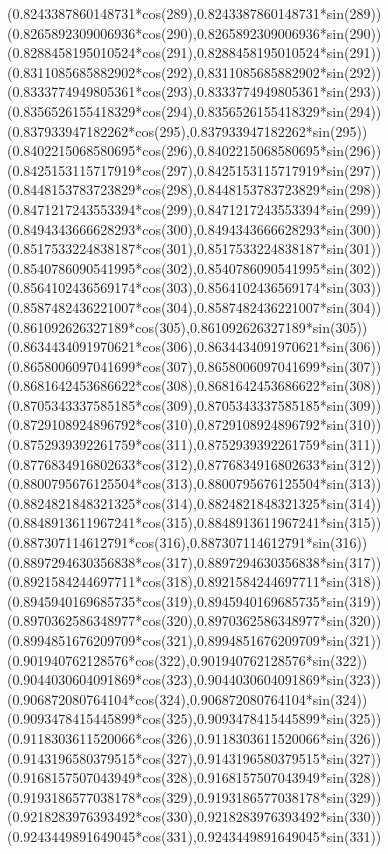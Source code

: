 {({0.8243387860148731*cos(289)},{0.8243387860148731*sin(289)})
({0.8265892309006936*cos(290)},{0.8265892309006936*sin(290)})
({0.8288458195010524*cos(291)},{0.8288458195010524*sin(291)})
({0.8311085685882902*cos(292)},{0.8311085685882902*sin(292)})
({0.8333774949805361*cos(293)},{0.8333774949805361*sin(293)})
({0.8356526155418329*cos(294)},{0.8356526155418329*sin(294)})
({0.837933947182262*cos(295)},{0.837933947182262*sin(295)})
({0.8402215068580695*cos(296)},{0.8402215068580695*sin(296)})
({0.8425153115717919*cos(297)},{0.8425153115717919*sin(297)})
({0.8448153783723829*cos(298)},{0.8448153783723829*sin(298)})
({0.8471217243553394*cos(299)},{0.8471217243553394*sin(299)})
({0.8494343666628293*cos(300)},{0.8494343666628293*sin(300)})
({0.8517533224838187*cos(301)},{0.8517533224838187*sin(301)})
({0.8540786090541995*cos(302)},{0.8540786090541995*sin(302)})
({0.8564102436569174*cos(303)},{0.8564102436569174*sin(303)})
({0.8587482436221007*cos(304)},{0.8587482436221007*sin(304)})
({0.861092626327189*cos(305)},{0.861092626327189*sin(305)})
({0.8634434091970621*cos(306)},{0.8634434091970621*sin(306)})
({0.8658006097041699*cos(307)},{0.8658006097041699*sin(307)})
({0.8681642453686622*cos(308)},{0.8681642453686622*sin(308)})
({0.8705343337585185*cos(309)},{0.8705343337585185*sin(309)})
({0.8729108924896792*cos(310)},{0.8729108924896792*sin(310)})
({0.8752939392261759*cos(311)},{0.8752939392261759*sin(311)})
({0.8776834916802633*cos(312)},{0.8776834916802633*sin(312)})
({0.8800795676125504*cos(313)},{0.8800795676125504*sin(313)})
({0.8824821848321325*cos(314)},{0.8824821848321325*sin(314)})
({0.8848913611967241*cos(315)},{0.8848913611967241*sin(315)})
({0.887307114612791*cos(316)},{0.887307114612791*sin(316)})
({0.8897294630356838*cos(317)},{0.8897294630356838*sin(317)})
({0.8921584244697711*cos(318)},{0.8921584244697711*sin(318)})
({0.8945940169685735*cos(319)},{0.8945940169685735*sin(319)})
({0.8970362586348977*cos(320)},{0.8970362586348977*sin(320)})
({0.8994851676209709*cos(321)},{0.8994851676209709*sin(321)})
({0.901940762128576*cos(322)},{0.901940762128576*sin(322)})
({0.9044030604091869*cos(323)},{0.9044030604091869*sin(323)})
({0.906872080764104*cos(324)},{0.906872080764104*sin(324)})
({0.9093478415445899*cos(325)},{0.9093478415445899*sin(325)})
({0.9118303611520066*cos(326)},{0.9118303611520066*sin(326)})
({0.9143196580379515*cos(327)},{0.9143196580379515*sin(327)})
({0.9168157507043949*cos(328)},{0.9168157507043949*sin(328)})
({0.9193186577038178*cos(329)},{0.9193186577038178*sin(329)})
({0.9218283976393492*cos(330)},{0.9218283976393492*sin(330)})
({0.9243449891649045*cos(331)},{0.9243449891649045*sin(331)})
}
